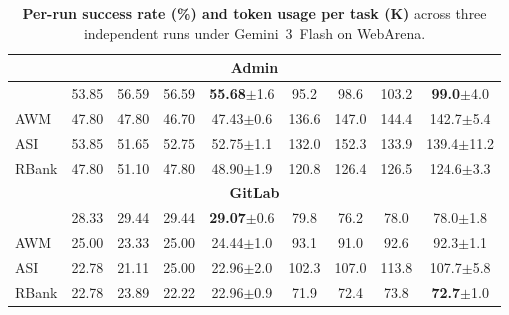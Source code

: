 \begin{table}[ht]
\begin{tabular}{lcccccccc}
\midrule
\multicolumn{9}{c}{\textbf{Admin}} \\
\midrule
\budgetactor{}      & 53.85 & 56.59 & 56.59 & \textbf{55.68}{\scriptsize $\pm$1.6} &  95.2 &  98.6 & 103.2 &  \textbf{99.0}{\scriptsize $\pm$4.0} \\
AWM            & 47.80 & 47.80 & 46.70 & 47.43{\scriptsize $\pm$0.6} & 136.6 & 147.0 & 144.4 & 142.7{\scriptsize $\pm$5.4} \\
ASI            & 53.85 & 51.65 & 52.75 & 52.75{\scriptsize $\pm$1.1} & 132.0 & 152.3 & 133.9 & 139.4{\scriptsize $\pm$11.2} \\
RBank          & 47.80 & 51.10 & 47.80 & 48.90{\scriptsize $\pm$1.9} & 120.8 & 126.4 & 126.5 & 124.6{\scriptsize $\pm$3.3} \\
\midrule
\multicolumn{9}{c}{\textbf{GitLab}} \\
\midrule
\budgetactor{}      & 28.33 & 29.44 & 29.44 & \textbf{29.07}{\scriptsize $\pm$0.6} & 79.8 & 76.2 & 78.0 & 78.0{\scriptsize $\pm$1.8} \\
AWM            & 25.00 & 23.33 & 25.00 & 24.44{\scriptsize $\pm$1.0} & 93.1 & 91.0 & 92.6 & 92.3{\scriptsize $\pm$1.1} \\
ASI            & 22.78 & 21.11 & 25.00 & 22.96{\scriptsize $\pm$2.0} & 102.3 & 107.0 & 113.8 & 107.7{\scriptsize $\pm$5.8} \\
RBank          & 22.78 & 23.89 & 22.22 & 22.96{\scriptsize $\pm$0.9} & 71.9 & 72.4 & 73.8 & \textbf{72.7}{\scriptsize $\pm$1.0} \\
\bottomrule
\end{tabular}
\caption{\textbf{Per-run success rate (\%) and token usage per task (K)} across three independent runs under Gemini~3~Flash on WebArena.}
\label{tab:variance-gemini}
\end{table}

